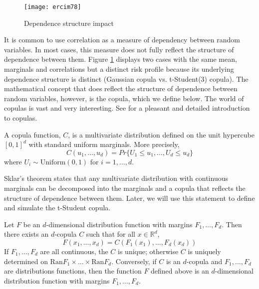 \documentclass[11pt,fleqn]{book} %
\begin{document}
\begin{figure}
	\vspace{-25pt}
	\begin{center}
		\texttt{[image: ercim78]}
	\end{center}
	\vspace{-10pt}
	\caption{Dependence structure impact}
	\vspace{-10pt}
	\label{fig:copula_impact}
\end{figure}
It is common to use correlation as a measure of dependency between random 
variables. In most cases, this measure does not fully reflect the structure 
of dependence between them. Figure \ref{fig:copula_impact} displays two
cases with the same mean, marginals and correlations but a distinct risk
profile because its underlying  dependence structure is distinct (Gaussian 
copula vs. t-Student(3) copula). The mathematical concept that does reflect 
the structure of dependence between random variables, however, is the copula, 
which we define below. The world of copulas is vast and very interesting. 
See \cite{embrechts:2002} \cite[chap. 5]{mcneil:2005} for a pleasant and detailed 
introduction to copulas.

\begin{definition}[Copula]
	A copula function, $C$, is a multivariate distribution defined on the 
	unit hypercube $[0,1]^d$ with standard uniform marginals. 
	More precisely,
	\begin{displaymath}
		C(u_1, \dots, u_d) = Pr\{U_1 \le u_1, \dots, U_d \le u_d\}
	\end{displaymath}
	where $U_i \sim \text{Uniform}(0,1) \text{ for } i = 1,\dots, d$.
\end{definition}

Sklar's theorem \cite{sklar:1959} states that any multivariate 
distribution with continuous marginals can be decomposed into the marginals and 
a copula that reflects the structure of dependence between them. Later, we will 
use this statement to define and simulate the t-Student copula.

\begin{theorem}
	\label{thm:sklar}
	Let $F$ be an $d$-dimensional distribution function with margins $F_1,\dots,F_d$.
	Then there exists an $d$-copula $C$ such that for all $x \in \mathbb{R}^d$,
	\begin{displaymath}
		F(x_1,\dots,x_d) = C(F_1(x_1),\dots,F_d(x_d))
	\end{displaymath}
	If $F_1,\dots,F_d$ are all continuous, the $C$ is unique; otherwise $C$ is uniquely
	determined on $\text{Ran}F_1 \times \dots \times \text{Ran}F_d$.
	Conversely, if $C$ is an $d$-copula and $F_1,\dots,F_d$ are distributions functions,
	then the function $F$ defined above is an $d$-dimensional distribution function
	with margins $F_1,\dots,F_d$.
\end{theorem}
\end{document}
